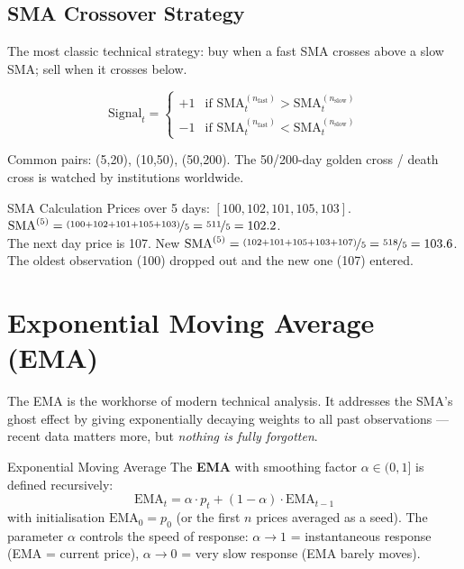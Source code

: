 \documentclass[12pt,a4paper,openany]{report}
\theoremstyle{definition}
\begin{document}
\subsection{SMA Crossover Strategy}

The most classic technical strategy: buy when a fast SMA crosses above a slow SMA; sell when it crosses below.

\begin{equation}
  \text{Signal}_t = \begin{cases} +1 & \text{if } \text{SMA}^{(n_\text{fast})}_t > \text{SMA}^{(n_\text{slow})}_t \\ -1 & \text{if } \text{SMA}^{(n_\text{fast})}_t < \text{SMA}^{(n_\text{slow})}_t \end{cases}
\end{equation}

Common pairs: (5,20), (10,50), (50,200). The 50/200-day golden cross / death cross is watched by institutions worldwide.

\begin{examplebox}{SMA Calculation}
Prices over 5 days: $[100, 102, 101, 105, 103]$. \\
$\text{SMA}^{(5)} = \nicefrac{(100+102+101+105+103)}{5} = \nicefrac{511}{5} = 102.2$.\\
The next day price is 107. New $\text{SMA}^{(5)} = \nicefrac{(102+101+105+103+107)}{5} = \nicefrac{518}{5} = 103.6$.\\
The oldest observation (100) dropped out and the new one (107) entered.
\end{examplebox}

\section{Exponential Moving Average (EMA)}

The EMA is the workhorse of modern technical analysis. It addresses the SMA's ghost effect by giving exponentially decaying weights to all past observations — recent data matters more, but \emph{nothing is fully forgotten}.

\begin{definitionbox}{Exponential Moving Average}
The \textbf{EMA} with smoothing factor $\alpha \in (0,1]$ is defined recursively:
\[
  \text{EMA}_t = \alpha \cdot p_t + (1 - \alpha) \cdot \text{EMA}_{t-1}
\]
with initialisation $\text{EMA}_0 = p_0$ (or the first $n$ prices averaged as a seed). The parameter $\alpha$ controls the speed of response: $\alpha \to 1$ = instantaneous response (EMA = current price), $\alpha \to 0$ = very slow response (EMA barely moves).
\end{definitionbox}
\end{document}
